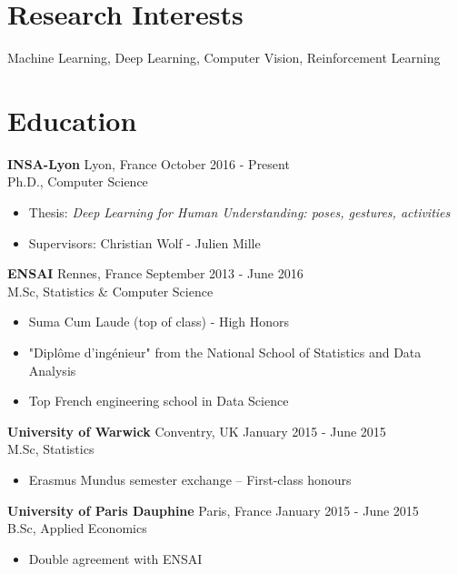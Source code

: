 \documentclass[10pt]{res} %
\begin{document}
\begin{resume}

 
\section{\large Research Interests}  
Machine Learning, Deep Learning, Computer Vision, Reinforcement Learning


\section{\large Education}
\textbf{INSA-Lyon} \hfill Lyon, France \hfill October 2016 - Present \\
Ph.D., Computer Science
\begin{itemize}
\item  Thesis: {\sl Deep Learning for Human Understanding: poses, gestures, activities}
\item  Supervisors: Christian Wolf - Julien Mille
\end{itemize}


\textbf{ENSAI} \hfill Rennes, France \hfill September 2013 - June 2016 \\
M.Sc, Statistics \& Computer Science
\begin{itemize}
\item Suma Cum Laude (top of class) - High Honors
\item "Diplôme d'ingénieur" from the National School of Statistics and Data Analysis
\item Top French engineering school in Data Science
\end{itemize}

\textbf{University of Warwick} \hfill Conventry, UK \hfill January 2015 - June 2015 \\
M.Sc, Statistics
\begin{itemize}
\item Erasmus Mundus semester exchange -- First-class honours
\end{itemize}

\textbf{University of Paris Dauphine} \hfill Paris, France \hfill January 2015 - June 2015 \\
B.Sc, Applied Economics
\begin{itemize}
\item Double agreement with ENSAI
\end{itemize}


\end{resume}
\end{document}
